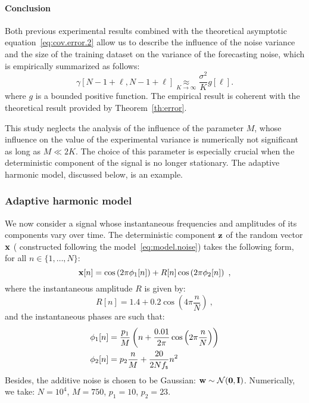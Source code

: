 \paragraph{Conclusion}
Both previous experimental results combined with the theoretical asymptotic equation~\eqref{eq:cov.error.2} allow us to describe the influence of the noise variance and the size of the training dataset on the variance of the forecasting noise, which is empirically summarized as follows:
\begin{equation}
\gamma[N-1+\ell,N-1+\ell] \underset{K\to\infty}{\approx} \dfrac{\sigma^2}{K}g[\ell] .
\end{equation} 
where $g$ is a bounded positive function. The empirical result is coherent with the theoretical result provided by Theorem~\ref{th:error}.

This study neglects the analysis of the influence of the parameter $M$, whose influence on the value of the experimental variance is numerically not significant as long as $M\ll 2K$. The choice of this parameter is especially crucial when the deterministic component of the signal is no longer stationary. The adaptive harmonic model, discussed below, is an example.

\subsubsection{Adaptive harmonic model}
\label{ssse:res.ahm}
We now consider a signal whose instantaneous frequencies and amplitudes of its components vary over time. The deterministic component ${\mathbf z}$ of the random vector ${\mathbf x}$ ( constructed following the model~\eqref{eq:model.noise}) takes the following form, for all $n\in\{1,\ldots,N\}$:
\[
{\mathbf x}[n] = \cos\left(2\pi \phi_1[n] \right) + R[n]\cos\left(2\pi \phi_2[n] \right) \ ,
\] 
where the instantaneous amplitude $R$ is given by:
\[
R[n] = 1.4 + 0.2\cos\left(4\pi\frac{n}{N}\right)\ ,
\]
and the instantaneous phases are such that:
\begin{align*}
\phi_1[n] &= \frac{p_1}{M}\left( n + \frac{0.01}{2\pi}\cos\left(2\pi\frac{n}{N}\right) \right) \\
\phi_2[n] & = p_2\frac{n}{M} + \frac{20}{2Nf_{\mathsf s}}n^2
\end{align*}
Besides, the additive noise is chosen to be Gaussian: ${\mathbf w}\sim{\mathcal N}(\boldsymbol{0},{\mathbf I})$. Numerically, we take: $N=10^4$, $M=750$, $p_1=10$, $p_2=23$.

